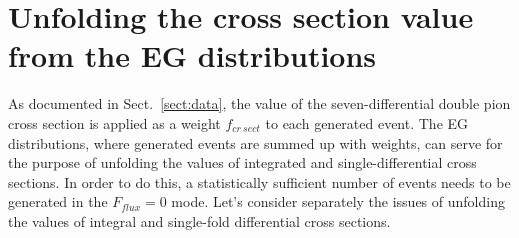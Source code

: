 \chapter{Unfolding the cross section value from the EG distributions}
\label{unfold}



As documented in Sect.~\ref{sect:data}, the value of the seven-differential double pion cross section is applied as a weight $f_{cr~sect}$ to each generated event. The EG distributions, where generated events are summed up with weights, can serve for the purpose of unfolding the values of integrated and single-differential cross sections. In order to do this, a statistically sufficient number of events needs to be generated in the $F_{flux}=0$ mode. Let's consider separately the issues of unfolding the values of integral and single-fold differential cross sections.



